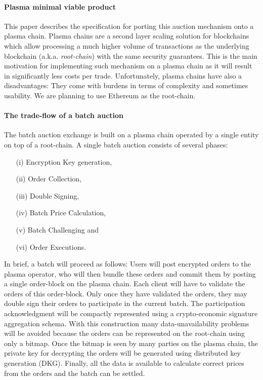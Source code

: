 \documentclass[11pt,parskip=full]{scrartcl}%
\begin{document}
\paragraph{Plasma minimal viable product}

This paper describes the specification for porting this auction mechanism onto a plasma chain. Plasma chains are a second layer scaling solution for blockchains which allow processing a much higher volume of transactions as the underlying blockchain (a.k.a. \emph{root-chain}) with the same security guarantees. This is the main motivation for implementing such mechanism on a plasma chain as it will result in significantly less costs per trade. Unfortunately, plasma chains have also a disadvantages: They come with burdens in terms of complexity and sometimes usability. We are planning to use Ethereum as the root-chain. 

\paragraph{The trade-flow of a batch auction}  

The batch auction exchange is built on a plasma chain operated by a single entity on top of a root-chain. A single batch auction consists of several phases:
\begin{itemize}
\item[(i)] Encryption Key generation, 
\item[(ii)] Order Collection, 
\item[(iii)] Double Signing, 
\item[(iv)] Batch Price Calculation, 
\item[(v)] Batch Challenging and 
\item[(vi)] Order Executions. 
\end{itemize}
In brief, a batch will proceed as follows: Users will post encrypted orders to the plasma operator, who will then bundle these orders and commit them by posting a single order-block on the plasma chain. Each client will have to validate the orders of this order-block. Only once they have validated the orders, they may double sign their orders to participate in the current batch. The participation acknowledgment will be compactly represented using a crypto-economic signature aggregation schema. With this construction many data-unavailability problems will be avoided because the orders can be represented on the root-chain using only a bitmap.
Once the bitmap is seen by many parties on the plasma chain, the private key for decrypting the orders will be generated using distributed key generation (DKG). Finally, all the data is available to calculate correct prices from the orders and the batch can be settled. 
\end{document}
